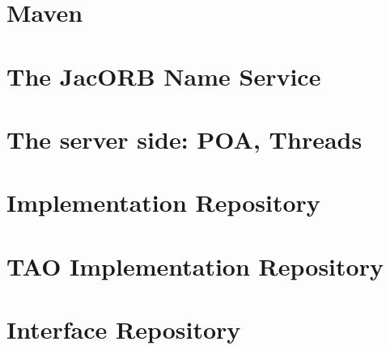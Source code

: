 \documentclass[12pt]{scrbook}
\begin{document}



\chapter{Maven}
\label{ch:mvn}




\chapter{The JacORB Name Service}
\label{ch:naming}




\chapter{The server side: POA, Threads}
\label{ch:POA}




\chapter{Implementation Repository}
\label{Ch_Imr}




\chapter{TAO Implementation Repository}
\label{Ch_Tao_Imr}



\chapter{Interface Repository}
\label{ch:interface_repository}
\end{document}
